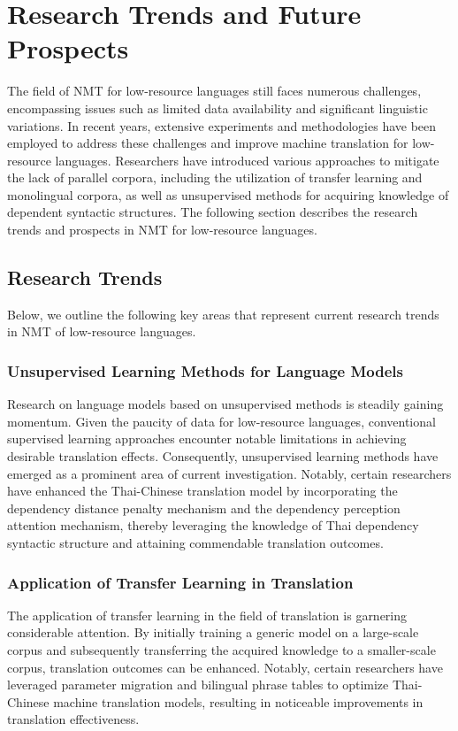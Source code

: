 \documentclass[acmsmall]{acmart}
\begin{document}

\section{Research Trends and Future Prospects}
\label{sec7}
The field of NMT for low-resource languages still faces numerous challenges, encompassing issues such as limited data availability and significant linguistic variations. In recent years, extensive experiments and methodologies have been employed to address these challenges and improve machine translation for low-resource languages. Researchers have introduced various approaches to mitigate the lack of parallel corpora, including the utilization of transfer learning and monolingual corpora, as well as unsupervised methods for acquiring knowledge of dependent syntactic structures. The following section describes the research trends and prospects in NMT for low-resource languages.
\subsection{Research Trends}
Below, we outline the following key areas that represent current research trends in NMT of low-resource languages.

\subsubsection{Unsupervised Learning Methods for Language Models}
Research on language models based on unsupervised methods is steadily gaining momentum. Given the paucity of data for low-resource languages, conventional supervised learning approaches encounter notable limitations in achieving desirable translation effects. Consequently, unsupervised learning methods have emerged as a prominent area of current investigation. Notably, certain researchers have enhanced the Thai-Chinese translation model by incorporating the dependency distance penalty mechanism and the dependency perception attention mechanism, thereby leveraging the knowledge of Thai dependency syntactic structure and attaining commendable translation outcomes.

\subsubsection{Application of Transfer Learning in Translation}
The application of transfer learning in the field of translation is garnering considerable attention. By initially training a generic model on a large-scale corpus and subsequently transferring the acquired knowledge to a smaller-scale corpus, translation outcomes can be enhanced. Notably, certain researchers have leveraged parameter migration and bilingual phrase tables to optimize Thai-Chinese machine translation models, resulting in noticeable improvements in translation effectiveness.
\end{document}
